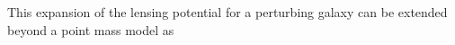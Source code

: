 This expansion of the lensing potential for a perturbing galaxy can be extended beyond a point mass model as
